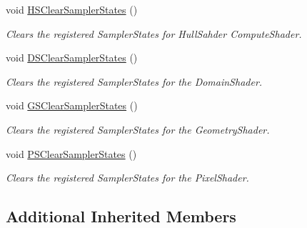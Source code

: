 \begin{DoxyCompactItemize}
void \hyperlink{class_osiris_i_1_1_graphics_1_1_shader_1_1_d_x11_shader_a674963e4b265c8838ecbdd02426fe06d}{H\-S\-Clear\-Sampler\-States} ()
\begin{DoxyCompactList}\small\item\em Clears the registered Sampler\-States for Hull\-Sahder Compute\-Shader. \end{DoxyCompactList}\item 
void \hyperlink{class_osiris_i_1_1_graphics_1_1_shader_1_1_d_x11_shader_a3549342296c043752da841a2df3a56f2}{D\-S\-Clear\-Sampler\-States} ()
\begin{DoxyCompactList}\small\item\em Clears the registered Sampler\-States for the Domain\-Shader. \end{DoxyCompactList}\item 
void \hyperlink{class_osiris_i_1_1_graphics_1_1_shader_1_1_d_x11_shader_a8a79b9055e21a88ade6007d3a83997dc}{G\-S\-Clear\-Sampler\-States} ()
\begin{DoxyCompactList}\small\item\em Clears the registered Sampler\-States for the Geometry\-Shader. \end{DoxyCompactList}\item 
void \hyperlink{class_osiris_i_1_1_graphics_1_1_shader_1_1_d_x11_shader_a86f12d00c0d0a33b88a1057931c92cda}{P\-S\-Clear\-Sampler\-States} ()
\begin{DoxyCompactList}\small\item\em Clears the registered Sampler\-States for the Pixel\-Shader. \end{DoxyCompactList}\end{DoxyCompactItemize}
\subsection*{Additional Inherited Members}


